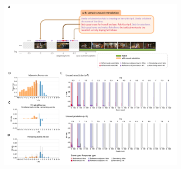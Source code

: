 \documentclass[10pt]{article}
\providecommand{\DIFaddbeginFL}{} %
\newcommand{\DIFaddincludegraphics}[2][]{{\color{blue}\fbox{\DIFOincludegraphics[#1]{#2}}}} %
\DeclareRobustCommand{\DIFaddbeginFL}{\DIFOaddbeginFL \let\includegraphics\DIFaddincludegraphics} %
\begin{document}
\begin{figure}[tp]
  \centering
  \includegraphics[width=0.8\textwidth]{results4}
\DIFaddbeginFL 


\end{figure}
\end{document}
